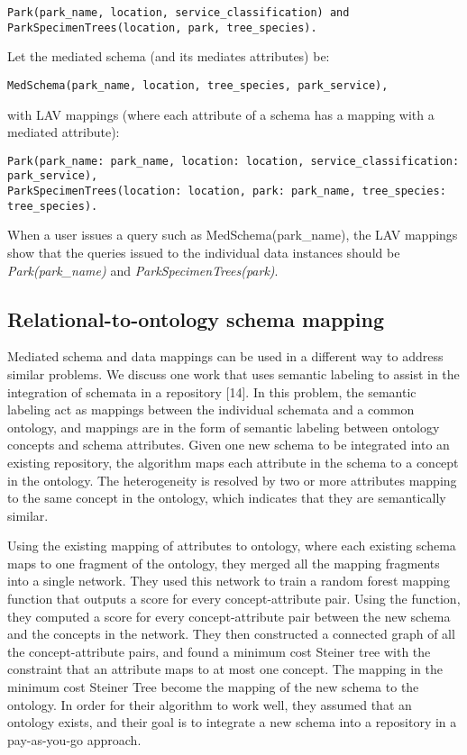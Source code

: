 \begin{lstlisting}
Park(park_name, location, service_classification) and
ParkSpecimenTrees(location, park, tree_species).
\end{lstlisting}

Let the mediated schema (and its mediates attributes) be:

\begin{lstlisting}
MedSchema(park_name, location, tree_species, park_service),
\end{lstlisting}

with LAV mappings (where each attribute of a schema has a mapping with a mediated attribute):
\begin{lstlisting}
Park(park_name: park_name, location: location, service_classification: park_service),
ParkSpecimenTrees(location: location, park: park_name, tree_species: tree_species).
\end{lstlisting}

When a user issues a query such as MedSchema(park\_name), the LAV mappings show that the queries issued to the individual data instances should be \textit{Park(park\_name)} and \textit{ParkSpecimenTrees(park)}.

\subsection{Relational-to-ontology schema mapping}

Mediated schema and data mappings can be used in a different way to address similar problems. We discuss one work that uses semantic labeling to assist in the integration of schemata in a repository \cite{Diego2018Machine}[14]. In this problem, the semantic labeling act as mappings between the individual schemata and a common ontology, and mappings are in the form of semantic labeling between ontology concepts and schema attributes. Given one new schema to be integrated into an existing repository, the algorithm maps each attribute in the schema to a concept in the ontology. The heterogeneity is resolved by two or more attributes mapping to the same concept in the ontology, which indicates that they are semantically similar.

Using the existing mapping of attributes to ontology, where each existing schema maps to one fragment of the ontology, they merged all the mapping fragments into a single network. They used this network to train a random forest mapping function that outputs a score for every concept-attribute pair. Using the function, they computed a score for every concept-attribute pair between the new schema and the concepts in the network. They then constructed a connected graph of all the concept-attribute pairs, and found a minimum cost Steiner tree with the constraint that an attribute maps to at most one concept. The mapping in the minimum cost Steiner Tree become the mapping of the new schema to the ontology. In order for their algorithm to work well, they assumed that an ontology exists, and their goal is to integrate a new schema into a repository in a pay-as-you-go approach.

